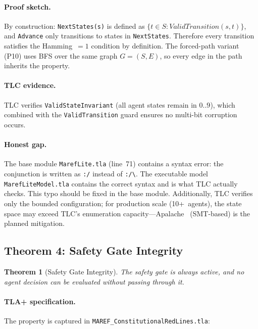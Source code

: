 \documentclass[11pt]{article}
\newtheorem{theorem}{Theorem}
\begin{document}
\paragraph{Proof sketch.} By construction: \texttt{NextStates(s)} is defined as
$\{t \in S : \mathit{ValidTransition}(s, t)\}$, and \texttt{Advance} only
transitions to states in \texttt{NextStates}. Therefore every transition
satisfies the Hamming~$=1$ condition by definition. The forced-path variant
(P10) uses BFS over the same graph $G = (S, E)$, so every edge in the path
inherits the property.

\paragraph{TLC evidence.} TLC verifies \texttt{ValidStateInvariant} (all agent
states remain in $0..9$), which combined with the \texttt{ValidTransition}
guard ensures no multi-bit corruption occurs.

\paragraph{Honest gap.} The base module \texttt{MarefLite.tla} (line~71)
contains a syntax error: the conjunction is written as \texttt{:/} instead of
\texttt{:/\textbackslash}. The executable model \texttt{MarefLiteModel.tla}
contains the correct syntax and is what TLC actually checks. This typo should
be fixed in the base module. Additionally, TLC verifies only the bounded
configuration; for production scale (10+~agents), the state space may exceed
TLC's enumeration capacity---Apalache~\cite{apalache} (SMT-based) is the
planned mitigation.

\subsection{Theorem 4: Safety Gate Integrity}

\begin{theorem}[Safety Gate Integrity]
The safety gate is always active, and no agent decision can be evaluated
without passing through it.
\end{theorem}

\paragraph{TLA+ specification.} The property is captured in
\texttt{MAREF\_ConstitutionalRedLines.tla}:
\end{document}
